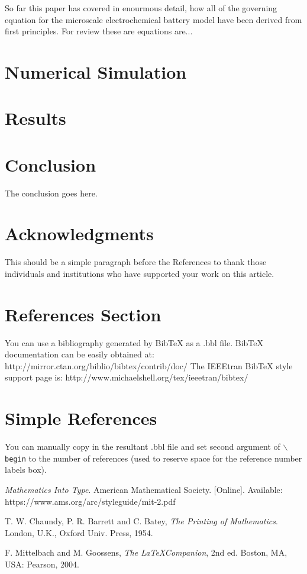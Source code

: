 \documentclass[lettersize,journal]{IEEEtran}
\begin{document}
So far this paper has covered in enourmous detail, how all of the governing equation for the microscale electrochemical battery model have been derived from first principles. For review these are equations are...



\section{Numerical Simulation}

\section{Results}

\section{Conclusion}
The conclusion goes here.


\section*{Acknowledgments}
This should be a simple paragraph before the References to thank those individuals and institutions who have supported your work on this article.

\section{References Section}
You can use a bibliography generated by BibTeX as a .bbl file.
 BibTeX documentation can be easily obtained at:
 http://mirror.ctan.org/biblio/bibtex/contrib/doc/
 The IEEEtran BibTeX style support page is:
 http://www.michaelshell.org/tex/ieeetran/bibtex/

%
%
\section{Simple References}
You can manually copy in the resultant .bbl file and set second argument of $\backslash${\tt{begin}} to the number of references
 (used to reserve space for the reference number labels box).

\begin{thebibliography}{1}


{\it{Mathematics Into Type}}. American Mathematical Society. [Online]. Available: https://www.ams.org/arc/styleguide/mit-2.pdf

T. W. Chaundy, P. R. Barrett and C. Batey, {\it{The Printing of Mathematics}}. London, U.K., Oxford Univ. Press, 1954.

F. Mittelbach and M. Goossens, {\it{The \LaTeX Companion}}, 2nd ed. Boston, MA, USA: Pearson, 2004.

\end{thebibliography}
\end{document}
